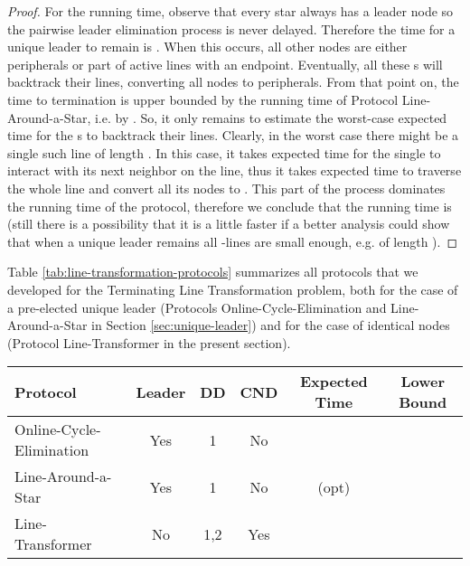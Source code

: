\documentclass[preprint]{elsarticle}
\begin{document}
\begin{proof}
For the running time, observe that every star always has a leader node so the pairwise leader elimination process is never delayed. Therefore the time for a unique leader to remain is . When this occurs, all other nodes are either peripherals or part of active lines with an  endpoint. Eventually, all these s will backtrack their lines, converting all nodes to peripherals. From that point on, the time to termination is upper bounded by the running time of Protocol Line-Around-a-Star, i.e. by . So, it only remains to estimate the worst-case expected time for the s to backtrack their lines. Clearly, in the worst case there might be a single such line of length . In this case, it takes  expected time for the single  to interact with its next neighbor on the line, thus it takes  expected time to traverse the whole line and convert all its nodes to . This part of the process dominates the running time of the protocol, therefore we conclude that the running time is  (still there is a possibility that it is a little faster if a better analysis could show that when a unique leader remains all -lines are small enough, e.g. of length ). 
\end{proof}

Table \ref{tab:line-transformation-protocols} summarizes all protocols that we developed for the Terminating Line Transformation problem, both for the case of a pre-elected unique leader (Protocols Online-Cycle-Elimination and Line-Around-a-Star in Section \ref{sec:unique-leader}) and for the case of identical nodes (Protocol Line-Transformer in the present section).

\begin{table*}[!hbtp]
\normalsize
\setlength{\tabcolsep}{10pt}
\begin{center}
\begin{tabular}{  l  c c c c c  }
  \hline
  Protocol & Leader & DD & CND & Expected Time & Lower Bound \\ \hline
  Online-Cycle-Elimination & Yes & 1 & No &  &  \\ 
  Line-Around-a-Star & Yes & 1 & No &  (opt) &  \\
  Line-Transformer & No & 1,2 & Yes&  &  \\ \hline
\end{tabular}
\end{center}
\caption{All protocols developed in this work for the Terminating Line Transformation problem. For each of these protocols, the table shows whether it makes use of a pre-elected unique leader, what local degree detection it uses (DD), whether it uses common neighbor detection (CND), and also its expected running time under the uniform random scheduler. The last column shows the best known lower bound for the problem.}
\label{tab:line-transformation-protocols}
\end{table*}
\end{document}

